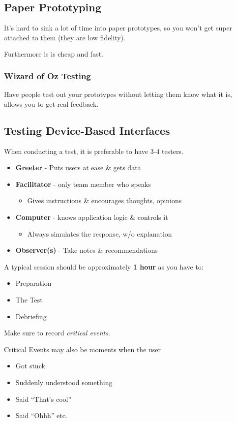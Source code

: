 \subsection{Paper Prototyping}
It's hard to sink a lot of time into paper prototypes, so you won't get super attached to them (they are low fidelity).

Furthermore is is cheap and fast.

\subsubsection{Wizard of Oz Testing}
Have people test out your prototypes without letting them know what it is, allows you to get real feedback.

\subsection{Testing Device-Based Interfaces}
When conducting a test, it is preferable to have 3-4 testers.
\begin{itemize}
    \item \textbf{Greeter} - Puts users at ease \& gets data
    \item \textbf{Facilitator} - only team member who speaks
    \begin{itemize}
        \item Gives instructions \& encourages thoughts, opinions
    \end{itemize}
    \item \textbf{Computer} - knows application logic \& controls it
    \begin{itemize}
        \item Always simulates the response, w/o explanation
    \end{itemize}
    \item \textbf{Observer(s)} - Take notes \& recommendations
\end{itemize}
A typical session should be approximately \textbf{1 hour} as you have to:
\begin{itemize}
    \item Preparation
    \item The Test
    \item Debriefing
\end{itemize}

\begin{important}
    Make sure to record \textit{critical events}.

    Critical Events may also be moments when the user
    \begin{itemize}
        \item Got stuck
        \item Suddenly understood something
        \item Said ``That's cool''
        \item Said ``Ohhh'' etc. 
    \end{itemize}
\end{important}


